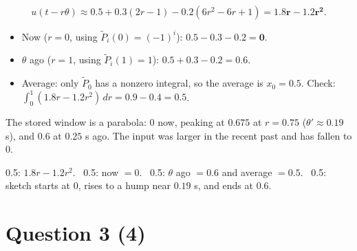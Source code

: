 \documentclass[11pt,letterpaper]{article}
\newcommand{\ans}[1]{\par\vspace{4pt}{\bfseries #1}\quad}
\begin{document}
\ans{(b) [2]}
\[
u(t - r\theta) \approx 0.5 + 0.3(2r - 1) - 0.2(6r^2 - 6r + 1) = \mathbf{1.8r - 1.2r^2}.
\]
\begin{itemize}[leftmargin=1.2em, itemsep=1pt]
\item Now ($r = 0$, using $\tilde P_i(0) = (-1)^i$): $0.5 - 0.3 - 0.2 = \mathbf{0}$.
\item $\theta$ ago ($r = 1$, using $\tilde P_i(1) = 1$): $0.5 + 0.3 - 0.2 = \mathbf{0.6}$.
\item Average: only $\tilde P_0$ has a nonzero integral, so the average is $x_0 = \mathbf{0.5}$. Check: $\int_0^1(1.8r - 1.2r^2)\,dr = 0.9 - 0.4 = 0.5$.
\end{itemize}
The stored window is a parabola: $0$ now, peaking at $0.675$ at $r = 0.75$ ($\theta' \approx 0.19$ s), and $0.6$ at $0.25$ s ago. The input was larger in the recent past and has fallen to $0$.
\begin{center}
\end{center}
\begin{marking}
0.5: $1.8r - 1.2r^2$. \ 0.5: now $= 0$. \ 0.5: $\theta$ ago $= 0.6$ and average $= 0.5$. \ 0.5: sketch starts at $0$, rises to a hump near $0.19$ s, and ends at $0.6$.
\end{marking}

\section*{Question 3 \hfill (4)}
\end{document}
